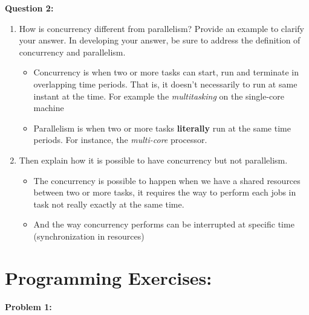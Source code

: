 \documentclass[a4paper]{article}
\begin{document}
\bigbreak
\textbf{Question 2:}
\begin{enumerate}[label=(\alph*)]
    \item How is concurrency different from parallelism? Provide an example to clarify your answer. In developing your answer, be sure to address the definition of concurrency and parallelism.

    \bigbreak
    \begin{itemize}
        \item Concurrency is when two or more tasks can start, run and terminate in overlapping time periods. That is, it doesn't necessarily to run at same instant at the time. For example the \textit{multitasking} on the single-core machine
        \item Parallelism is when two or more tasks \textbf{literally} run at the same time periods. For instance, the \textit{multi-core} processor.
    \end{itemize}

    \item Then explain how it is possible to have concurrency but not parallelism. \\
    
    \begin{itemize}
        \item The concurrency is possible to happen when we have a shared resources between two or more tasks, it requires the way to perform each jobs in task not really exactly at the same time.
        \item And the way concurrency performs can be interrupted at specific time (synchronization in resources)
    \end{itemize}
\end{enumerate}

\section{Programming Exercises:}

\textbf{Problem 1:} 
\end{document}
